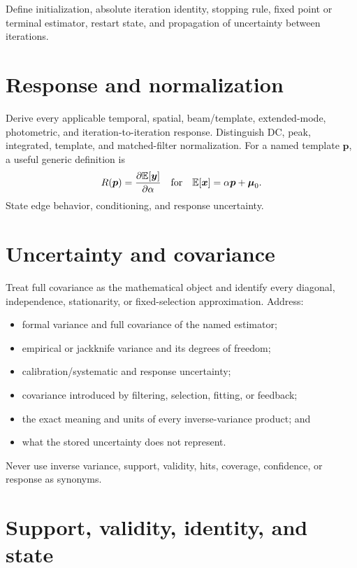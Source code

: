 \documentclass[11pt]{article}
\newcommand{\E}{\mathbb{E}}
\begin{document}
Define initialization, absolute iteration identity, stopping rule, fixed point
or terminal estimator, restart state, and propagation of uncertainty between
iterations.

\section{Response and normalization}

Derive every applicable temporal, spatial, beam/template, extended-mode,
photometric, and iteration-to-iteration response. Distinguish DC, peak,
integrated, template, and matched-filter normalization. For a named template
\(\boldsymbol p\), a useful generic definition is
\begin{equation}
  R(\boldsymbol p)=\frac{\partial \E[\boldsymbol y]}
                         {\partial \alpha}
  \quad\hbox{for}\quad
  \E[\boldsymbol x]=\alpha\boldsymbol p+\boldsymbol\mu_0.
  \label{eq:template-response}
\end{equation}
State edge behavior, conditioning, and response uncertainty.

\section{Uncertainty and covariance}

Treat full covariance as the mathematical object and identify every diagonal,
independence, stationarity, or fixed-selection approximation. Address:

\begin{itemize}
\item formal variance and full covariance of the named estimator;
\item empirical or jackknife variance and its degrees of freedom;
\item calibration/systematic and response uncertainty;
\item covariance introduced by filtering, selection, fitting, or feedback;
\item the exact meaning and units of every inverse-variance product; and
\item what the stored uncertainty does not represent.
\end{itemize}

Never use inverse variance, support, validity, hits, coverage, confidence, or
response as synonyms.

\section{Support, validity, identity, and state}
\end{document}
